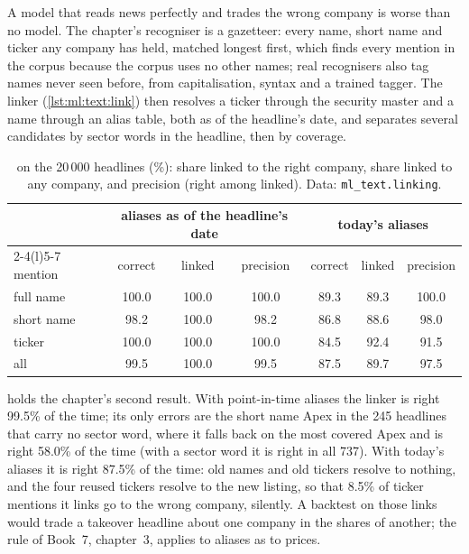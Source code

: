 A model that reads news perfectly and trades the wrong company is worse than no model. The chapter's recogniser is a
gazetteer: every name, short name and ticker any company has held, matched longest first, which finds every mention in the
corpus because the corpus uses no other names; real recognisers also tag names never seen before, from capitalisation,
syntax and a trained tagger. The linker (\cref{lst:ml:text:link}) then resolves a ticker through the security master and a
name through an alias table, both as of the headline's date, and separates several candidates by sector words in the
headline, then by coverage.

\begin{table}[htbp]
\centering\small
\begin{tabular}{@{}lcccccc@{}}
\toprule
& \multicolumn{3}{c}{aliases as of the headline's date} & \multicolumn{3}{c}{today's aliases}\\
\cmidrule(lr){2-4}\cmidrule(l){5-7}
mention & correct & linked & precision & correct & linked & precision\\
\midrule
full name & 100.0 & 100.0 & 100.0 & 89.3 & 89.3 & 100.0\\
short name & 98.2 & 100.0 & 98.2 & 86.8 & 88.6 & 98.0\\
ticker & 100.0 & 100.0 & 100.0 & 84.5 & 92.4 & 91.5\\
\midrule
all & 99.5 & 100.0 & 99.5 & 87.5 & 89.7 & 97.5\\
\bottomrule
\end{tabular}
\caption{ on the 20\,000 headlines (\%): share linked to the right company, share linked to any company, and
precision (right among linked). Data: \texttt{ml\_text.linking}.}\label{tab:ml:text:linking}
\end{table}

 holds the chapter's second result. With point-in-time aliases the linker is right 99.5\% of the
time; its only errors are the short name Apex in the 245 headlines that carry no sector word, where it falls back on the
most covered Apex and is right 58.0\% of the time (with a sector word it is right in all 737). With today's aliases it is
right 87.5\% of the time: old names and old tickers resolve to nothing, and the four reused tickers resolve to the new
listing, so that 8.5\% of ticker mentions it links go to the wrong company, silently. A backtest on those links would trade
a takeover headline about one company in the shares of another; the rule of Book~7, chapter~3, applies to aliases as to
prices.

